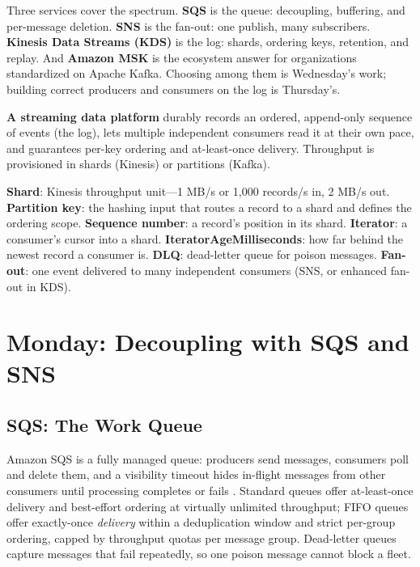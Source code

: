 Three services cover the spectrum. \textbf{SQS} is the queue: decoupling, buffering, and per-message deletion. \textbf{SNS} is the fan-out: one publish, many subscribers. \textbf{Kinesis Data Streams (KDS)} is the log: shards, ordering keys, retention, and replay. And \textbf{Amazon MSK} is the ecosystem answer for organizations standardized on Apache Kafka. Choosing among them is Wednesday's work; building correct producers and consumers on the log is Thursday's.

\begin{definitionbox}
\textbf{A streaming data platform} durably records an ordered, append-only sequence of events (the log), lets multiple independent consumers read it at their own pace, and guarantees per-key ordering and at-least-once delivery. Throughput is provisioned in shards (Kinesis) or partitions (Kafka).
\end{definitionbox}

\begin{keyterms}
\textbf{Shard}: Kinesis throughput unit---1 MB/s or 1{,}000 records/s in, 2 MB/s out. \textbf{Partition key}: the hashing input that routes a record to a shard and defines the ordering scope. \textbf{Sequence number}: a record's position in its shard. \textbf{Iterator}: a consumer's cursor into a shard. \textbf{IteratorAgeMilliseconds}: how far behind the newest record a consumer is. \textbf{DLQ}: dead-letter queue for poison messages. \textbf{Fan-out}: one event delivered to many independent consumers (SNS, or enhanced fan-out in KDS).
\end{keyterms}

\section{Monday: Decoupling with SQS and SNS}
\subsection{SQS: The Work Queue}
Amazon SQS is a fully managed queue: producers send messages, consumers poll and delete them, and a visibility timeout hides in-flight messages from other consumers until processing completes or fails \cite{awsSQSDocs}. Standard queues offer at-least-once delivery and best-effort ordering at virtually unlimited throughput; FIFO queues offer exactly-once \emph{delivery} within a deduplication window and strict per-group ordering, capped by throughput quotas per message group. Dead-letter queues capture messages that fail repeatedly, so one poison message cannot block a fleet.

